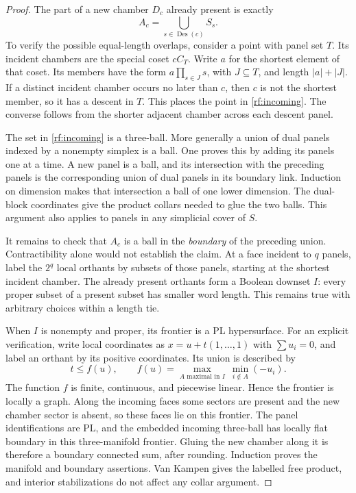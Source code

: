 \begin{proof}
The part of a new chamber $D_c$ already present is exactly
\begin{equation}
 \label{rf:incoming}
 A_c=\bigcup_{s\in\operatorname{Des}(c)}S_s.
\end{equation}
To verify the possible equal-length overlaps, consider a point with
panel set $T$.  Its incident chambers are the special coset $cC_T$.
Write $a$ for the shortest element of that coset.  Its members have
the form $a\prod_{s\in J}s$, with $J\subseteq T$, and length
$|a|+|J|$.  If a distinct incident chamber occurs no later than $c$,
then $c$ is not the shortest member, so it has a descent in $T$.
This places the point in \eqref{rf:incoming}.  The converse follows
from the shorter adjacent chamber across each descent panel.

The set in \eqref{rf:incoming} is a three-ball.  More generally a union
of dual panels indexed by a nonempty simplex is a ball.  One proves
this by adding its panels one at a time.  A new panel is a ball, and
its intersection with the preceding panels is the corresponding union
of dual panels in its boundary link.  Induction on dimension makes
that intersection a ball of one lower dimension.  The dual-block
coordinates give the product collars needed to glue the two balls.
This argument also applies to panels in any simplicial cover of $S$.

It remains to check that $A_c$ is a ball in the \emph{boundary} of the
preceding union.  Contractibility alone would not establish the claim.
At a face incident to $q$ panels, label the $2^q$ local orthants by
subsets of those panels, starting at the shortest incident chamber.
The already present orthants form a Boolean downset $I$: every proper
subset of a present subset has smaller word length.  This remains true
with arbitrary choices within a length tie.

When $I$ is nonempty and proper, its frontier is a PL hypersurface.
For an explicit verification, write local coordinates as
$x=u+t(1,\ldots,1)$ with $\sum u_i=0$, and label an orthant by its
positive coordinates.  Its union is described by
\[
 t\leq f(u),\qquad
 f(u)=\max_{A\text{ maximal in }I}\ 
               \min_{i\notin A}(-u_i).
\]
The function $f$ is finite, continuous, and piecewise linear.  Hence
the frontier is locally a graph.  Along the incoming faces some sectors
are present and the new chamber sector is absent, so these faces lie
on this frontier.  The panel identifications are PL, and the embedded
incoming three-ball has locally flat boundary in this three-manifold
frontier.  Gluing the new chamber along it is therefore a boundary
connected sum, after rounding.  Induction proves the manifold and
boundary assertions.  Van Kampen gives the labelled free product,
and interior stabilizations do not affect any collar argument.
\end{proof}

